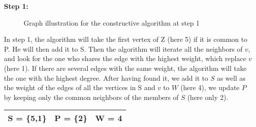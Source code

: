     \begin{minipage}{\linewidth}
        \textbf{Step 1:} \newline
        \begin{minipage}{0.4\textwidth}
            \begin{figure}[H]
                \centering
                \caption{Graph illustration for the constructive algorithm at step 1}
                \label{fig:constructive-mewc-edge}
            \end{figure}
        \end{minipage}
        \begin{minipage}{0.6\textwidth}
            In step 1, the algorithm will take the first vertex of Z (here 5) if it is common to P. He will then add it to S. 
            Then the algorithm will iterate all the neighbors of $v$, and look for the one who shares the edge with the highest weight, which replace $v$ (here 1). If there are several edges with the same weight, the algorithm will take the one with the highest degree. After having found it, we add it to $S$ as well as the weight of the edges of all the vertices in S and $v$ to $W$ (here 4), we update $P$ by keeping only the common neighbors of the members of $S$ (here only 2).
    
            \begin{center}
                \begin{tabular}{|lll|}
                    \hline
                    S = \{5,1\} & P = \{2\} & W = 4 \\
                    \hline
                \end{tabular}
            \end{center}
        \end{minipage}
    \end{minipage} 


